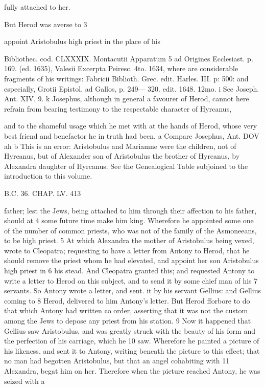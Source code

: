 fully attached to her. 

But Herod was averse to 3 

appoint Aristobulus high priest in the place of his 

Bibliothec. cod. CLXXXIX. Montacutii Apparatum 5 ad Origines Ecclesiast. p. 169. (ed. 1635), Valesii Excerpta Peiresc. 4to. 1634, where are considerable fragments of his writings: Fabricii Biblioth. Grec. edit. Harles. III. p: 500: and especially, Grotii Epistol. ad Gallos, p. 249— 320. edit. 1648. 12mo. 
i See Joseph. Ant. XIV. 9. 
k Josephus, although in general a favourer of Herod, cannot here refrain from bearing testimony to the respectable character of Hyrcanus, 

and to the shameful usage which he met with at the hands of Herod, whose very best friend and benefactor he in truth had been. 
a Compare Josephus, Ant. DOV ah 
b This is an error: Aristobulus and Mariamne were the children, not of Hyrcanus, but of Alexander son of Aristobulus the brother of Hyrcanus, by Alexandra daughter of Hyrcanus. See the Genealogical Table subjoined to the introduction to this volume. 

B.C. 36. CHAP. LV. 413 

father; lest the Jews, being attached to him through their affection to his father, should at 
4 some future time make him king. Wherefore he appointed some one of the number of common priests, who was not of the family of the Asmoneeans, to be high priest. 
5 At which Alexandra the mother of Aristobulus being vexed, wrote to Cleopatra; requesting to have a letter from Antony to Herod, that he should remove the priest whom he had elevated, and appoint her son Aristobulus high priest in 
6 his stead. And Cleopatra granted this; and requested Antony to write a letter to Herod on this subject, and to send it by some chief man of his 
7 servants. So Antony wrote a letter, and sent. it by his servant Gellius: and Gellius coming to 
8 Herod, delivered to him Antony’s letter. But Herod fforbore to do that which Antony had written ¢o order, asserting that it was not the custom among the Jews to depose any priest from his station. 
9 Now it happened that Gellius saw Aristobulus, and was greatly struck with the beauty of his form and the perfection of his carriage, which he 
10 saw. Wherefore he painted a picture of his likeness, and sent it to Antony, writing beneath the picture to this effect; that no man had begotten Aristobulus, but that an angel cohabiting with 
11 Alexandra, begat him on her. Therefore when the picture reached Antony, he was seized with a 

